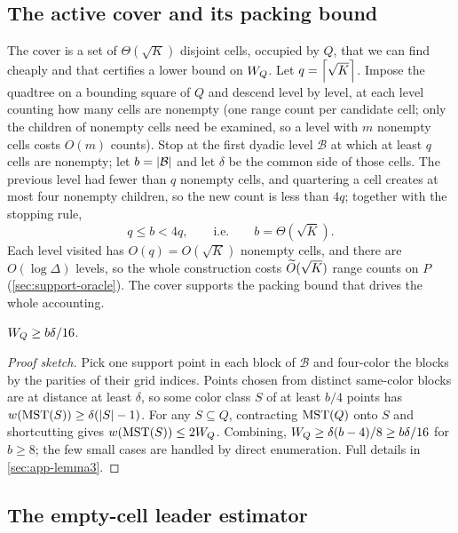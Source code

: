 \subsection{The active cover and its packing bound}\label{sec:support-cover}

The cover is a set of $\Theta(\sqrt K)$ disjoint cells, occupied by $Q$, that we can find cheaply and that
certifies a lower bound on $W_Q$. Let $q=\left\lceil \sqrt K \right\rceil$. Impose the quadtree on a bounding square of $Q$
and descend level by level, at each level counting how many cells are nonempty (one range count per
candidate cell; only the children of nonempty cells need be examined, so a level with $m$ nonempty cells
costs $O(m)$ counts). Stop at the first dyadic level $\mathcal B$ at which at least $q$ cells are nonempty;
let $b=\left|\mathcal B\right|$ and let $\delta$ be the common side of those cells. The previous level had fewer
than $q$ nonempty cells, and quartering a cell creates at most four nonempty children, so the new count is
less than $4q$; together with the stopping rule,
\begin{equation}\label{eq:cover-size}
  q\le b<4q,\qquad\text{i.e.}\qquad b=\Theta(\sqrt K).
\end{equation}
Each level visited has $O(q)=O(\sqrt K)$ nonempty cells, and there are $O(\log\Delta)$ levels, so the
whole construction costs $\widetilde{O}(\sqrt K)$ range counts on $P$ (\cref{sec:support-oracle}). The cover
supports the packing bound that drives the whole accounting.

\begin{lemma}\label{lem:packing}
$W_Q\ge b\delta/16$.
\end{lemma}

\begin{proof}[Proof sketch]
Pick one support point in each block of $\mathcal B$ and four-color the blocks by the parities of their
grid indices. Points chosen from distinct same-color blocks are at distance at least $\delta$, so some
color class $S$ of at least $b/4$ points has $w(\mathrm{MST}(S))\ge\delta(\left|S\right|-1)$. For any $S\subseteq Q$,
contracting $\mathrm{MST}(Q)$ onto $S$ and shortcutting gives $w(\mathrm{MST}(S))\le 2W_Q$. Combining,
$W_Q\ge\delta(b-4)/8\ge b\delta/16$ for $b\ge 8$; the few small cases are handled by direct enumeration.
Full details in \cref{sec:app-lemma3}.
\end{proof}

\subsection{The empty-cell leader estimator}\label{sec:support-estimator}

